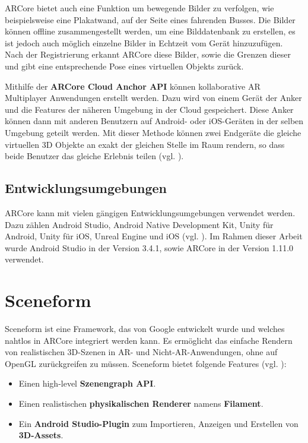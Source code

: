 ARCore bietet auch eine Funktion um bewegende Bilder zu verfolgen, wie beispielsweise eine Plakatwand, auf der Seite eines fahrenden Busses. Die Bilder können offline zusammengestellt werden, um eine Bilddatenbank zu erstellen, es ist jedoch auch möglich einzelne Bilder in Echtzeit vom Gerät hinzuzufügen. Nach der Registrierung erkannt ARCore diese Bilder, sowie die Grenzen dieser und gibt eine entsprechende Pose eines virtuellen Objekts zurück.

Mithilfe der \textbf{ARCore Cloud Anchor API} können kollaborative AR Multiplayer Anwendungen erstellt werden. Dazu wird von einem Gerät der Anker und die Features der näheren Umgebung in der Cloud gespeichert. Diese Anker können dann mit anderen Benutzern auf Android- oder iOS-Geräten in der selben Umgebung geteilt werden. Mit dieser Methode können zwei Endgeräte die gleiche virtuellen 3D Objekte an exakt der gleichen Stelle im Raum rendern, so dass beide Benutzer das gleiche Erlebnis teilen (vgl. \cite{fundamental_concepts}).

\subsection{Entwicklungsumgebungen}

ARCore kann mit vielen gängigen Entwicklungsumgebungen verwendet werden. Dazu zählen Android Studio, Android Native Development Kit, Unity für Android, Unity für iOS, Unreal Engine und iOS (vgl. \cite{develop}). Im Rahmen dieser Arbeit wurde Android Studio in der Version 3.4.1, sowie ARCore in der Version 1.11.0 verwendet.

\section{Sceneform}
Sceneform ist eine Framework, das von Google entwickelt wurde und welches nahtlos in ARCore integriert werden kann. Es ermöglicht das einfache Rendern von realistischen 3D-Szenen in AR- und Nicht-AR-Anwendungen, ohne auf OpenGL zurückgreifen zu müssen. Sceneform bietet folgende Features (vgl. \cite{sceneform}):

\begin{itemize}
\item Einen high-level \textbf{Szenengraph API}.
\item Einen realistischen \textbf{physikalischen Renderer} namens \textbf{Filament}.
\item Ein \textbf{Android Studio-Plugin} zum Importieren, Anzeigen und Erstellen von \textbf{3D-Assets}.
\end{itemize}

